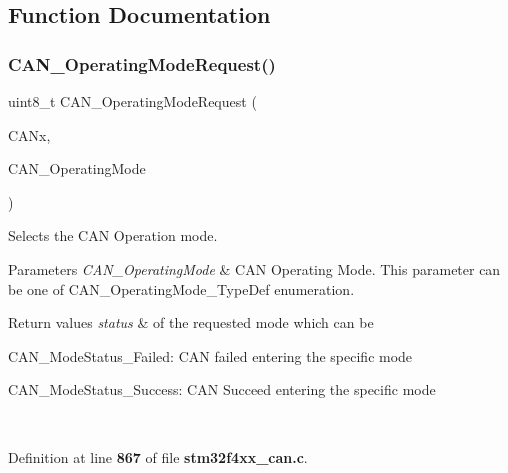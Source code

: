 \subsection{Function Documentation}
\mbox{\label{group__CAN__Group4_gab2a3630e9e3024114eb117d14e514208}} 
\subsubsection{C\+A\+N\+\_\+\+Operating\+Mode\+Request()}
{\footnotesize\ttfamily uint8\+\_\+t C\+A\+N\+\_\+\+Operating\+Mode\+Request (\begin{DoxyParamCaption}\item[{\textbf{ C\+A\+N\+\_\+\+Type\+Def} $\ast$}]{C\+A\+Nx,  }\item[{uint8\+\_\+t}]{C\+A\+N\+\_\+\+Operating\+Mode }\end{DoxyParamCaption})}



Selects the C\+AN Operation mode. 


\begin{DoxyParams}{Parameters}
{\em C\+A\+N\+\_\+\+Operating\+Mode} & C\+AN Operating Mode. This parameter can be one of C\+A\+N\+\_\+\+Operating\+Mode\+\_\+\+Type\+Def enumeration. \\
\hline
\end{DoxyParams}

\begin{DoxyRetVals}{Return values}
{\em status} & of the requested mode which can be
\begin{DoxyItemize}
\item C\+A\+N\+\_\+\+Mode\+Status\+\_\+\+Failed\+: C\+AN failed entering the specific mode
\item C\+A\+N\+\_\+\+Mode\+Status\+\_\+\+Success\+: C\+AN Succeed entering the specific mode 
\end{DoxyItemize}\\
\hline
\end{DoxyRetVals}


Definition at line \textbf{ 867} of file \textbf{ stm32f4xx\+\_\+can.\+c}.


